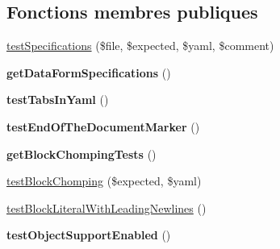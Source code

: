 \subsection*{Fonctions membres publiques}
\begin{DoxyCompactItemize}
\item 
\hyperlink{class_symfony_1_1_component_1_1_yaml_1_1_tests_1_1_parser_test_a738bdde605bb784c8e13effaae25335e}{test\+Specifications} (\$file, \$expected, \$yaml, \$comment)
\item 
{\bfseries get\+Data\+Form\+Specifications} ()\hypertarget{class_symfony_1_1_component_1_1_yaml_1_1_tests_1_1_parser_test_a4d2c7a09032d19aaa8ae922062bfcf31}{}\label{class_symfony_1_1_component_1_1_yaml_1_1_tests_1_1_parser_test_a4d2c7a09032d19aaa8ae922062bfcf31}

\item 
{\bfseries test\+Tabs\+In\+Yaml} ()\hypertarget{class_symfony_1_1_component_1_1_yaml_1_1_tests_1_1_parser_test_a0a8d9b3a7750f06b50acfc607ba24aa7}{}\label{class_symfony_1_1_component_1_1_yaml_1_1_tests_1_1_parser_test_a0a8d9b3a7750f06b50acfc607ba24aa7}

\item 
{\bfseries test\+End\+Of\+The\+Document\+Marker} ()\hypertarget{class_symfony_1_1_component_1_1_yaml_1_1_tests_1_1_parser_test_a9c759c68f80e4ccbc7e192909bb3b2e3}{}\label{class_symfony_1_1_component_1_1_yaml_1_1_tests_1_1_parser_test_a9c759c68f80e4ccbc7e192909bb3b2e3}

\item 
{\bfseries get\+Block\+Chomping\+Tests} ()\hypertarget{class_symfony_1_1_component_1_1_yaml_1_1_tests_1_1_parser_test_a5695b539cda3500e55d66dd83ed37ba4}{}\label{class_symfony_1_1_component_1_1_yaml_1_1_tests_1_1_parser_test_a5695b539cda3500e55d66dd83ed37ba4}

\item 
\hyperlink{class_symfony_1_1_component_1_1_yaml_1_1_tests_1_1_parser_test_a24ac2a444d8a5ad237cab8b0d1fa961c}{test\+Block\+Chomping} (\$expected, \$yaml)
\item 
\hyperlink{class_symfony_1_1_component_1_1_yaml_1_1_tests_1_1_parser_test_af1742ce6c9b9eeeac3168831dbfd6436}{test\+Block\+Literal\+With\+Leading\+Newlines} ()
\item 
{\bfseries test\+Object\+Support\+Enabled} ()\hypertarget{class_symfony_1_1_component_1_1_yaml_1_1_tests_1_1_parser_test_a57928b695e7198894d7d584c32715a9e}{}\label{class_symfony_1_1_component_1_1_yaml_1_1_tests_1_1_parser_test_a57928b695e7198894d7d584c32715a9e}


\end{DoxyCompactItemize}
